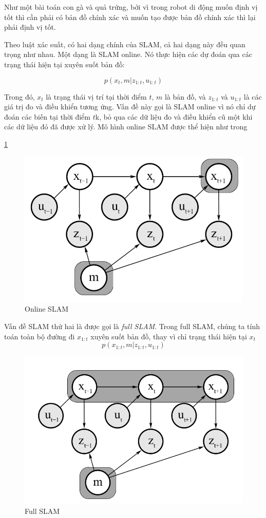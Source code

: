 {Như một bài toán con gà và quả trứng, bởi vì trong robot di động muốn định vị tốt thì cần phải có bản đồ chính xác và muốn tạo được bản đồ chính xác thì lại phải định vị tốt.

Theo luật xác suất, có hai dạng chính của SLAM, cả hai dạng này đều quan trọng như nhau. Một dạng là SLAM online. Nó thực hiện các dự đoán qua các trạng thái hiện tại xuyên suốt bản đồ:

\begin{equation}
  p\left({x}_{t}, m | {z}_{1:t}, {u}_{1:t}\right)
\end{equation}

Trong đó, ${x}_{t}$ là trạng thái vị trí tại thời điểm $t$, $m$ là bản đồ, và ${z}_{1:t}$ và ${u}_{1:t}$ là các giá trị đo và điều khiển tương ứng. Vấn đề này gọi là SLAM online vì nó chỉ dự đoán các biến tại thời điểm $t$k, bỏ qua các dữ liệu đo và điều khiển cũ một khi các dữ liệu đó đã được xử lý. Mô hình online SLAM được thể hiện như trong \figurename{ \ref{fig:onlineSLAM}

\begin{figure}[htbp]
  \centering
  \includegraphics[width=0.6\linewidth]{figures/onlineSLAM.PNG}
  \caption{Online SLAM}
  \label{fig:onlineSLAM}
\end{figure}

Vấn đề SLAM thứ hai là được gọi là \textit{full SLAM}. Trong full SLAM, chúng ta tính toán toàn bộ đường đi ${x}_{1:t}$ xuyên suốt bản đồ, thay vì chỉ trạng thái hiện tại ${x}_{t}$
\begin{equation}
  p\left({x}_{1:t},m | {z}_{1:t}, {u}_{1:t}\right)
\end{equation}

\begin{figure}[htbp]
  \centering
  \includegraphics[width=0.6\linewidth]{figures/fullSLAM.png}
  \caption{Full SLAM}
  \label{fig:fullSLAM}
\end{figure}

}}
